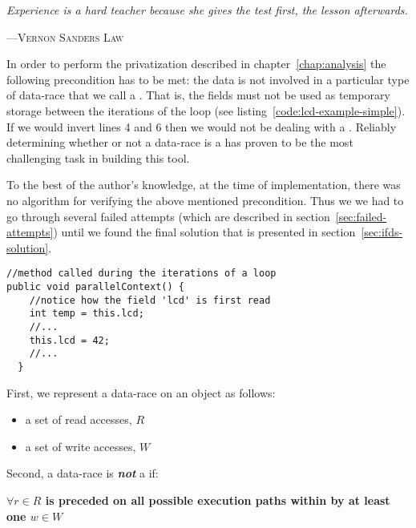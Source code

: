 \graphicspath{{content/lcd/figures/}}

\epigraph{\textit{Experience is a hard teacher because she gives the test first,
the lesson afterwards.}} %
{---\textsc{Vernon Sanders Law}} 

In order to perform the privatization described in chapter~\ref{chap:analysis}
the following precondition has to be met: the data is not involved in a
particular type of data-race that we call a \lcd.
That is, the fields must not be used as temporary storage between the
iterations of the loop (see listing~\ref{code:lcd-example-simple}). If we would
invert lines 4 and 6 then we would not be dealing with a \lcd. Reliably
determining whether or not a data-race is a \slcd has proven to be the most
challenging task in building this tool. 

To the best of the author's knowledge, at the time of implementation, there was
no algorithm for verifying the above mentioned precondition. Thus we we had to
go through several failed attempts (which are described in
section~\ref{sec:failed-attempts}) until we found the final solution that is
presented in section~\ref{sec:ifds-solution}.

\begin{lstlisting}[caption={Simple example of a loop carried dependency}, label
= {code:lcd-example-simple}]
//method called during the iterations of a loop
public void parallelContext() {
	//notice how the field 'lcd' is first read
    int temp = this.lcd;
    //...
    this.lcd = 42;
    //...
  }
\end{lstlisting}

First, we represent a data-race on an object as follows:
\begin{itemize}
  \item a set of read accesses, \begin{math} R \end{math}
  \item a set of write accesses, \begin{math} W \end{math}
\end{itemize}

Second, a data-race is \emph{\textbf{not}} a \slcd if:

\textbf{\begin{math} \forall r\in R \end{math} is preceded on all possible
execution paths within by at least one \begin{math}w\in W\end{math}}


